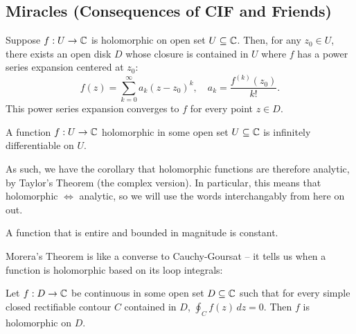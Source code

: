 \subsection{Miracles (Consequences of CIF and Friends)}
\begin{theorem}
  Suppose $f : U \to \mathbb C$ is holomorphic on open set $U \subseteq \mathbb C$. Then, for any $z_0 \in U$, there exists an open disk $D$ whose closure is contained in $U$ where $f$ has a power series expansion centered at $z_0$:
  \[ f(z) = \sum_{k = 0}^\infty a_k (z-z_0)^k, \quad a_k = \frac{f^{(k)}(z_0)}{k!}.\]
  This power series expansion converges to $f$ for every point $z \in D$.
\end{theorem}

\begin{corollary}
  A function $f : U \to \mathbb C$ holomorphic in some open set $U \subseteq \mathbb C$ is infinitely differentiable on $U$.
\end{corollary}
As such, we have the corollary that holomorphic functions are therefore analytic, by Taylor's Theorem (the complex version). In particular, this means that holomorphic $\Leftrightarrow$ analytic, so we will use the words interchangably from here on out.

\begin{theorem}
  A function that is entire and bounded in magnitude is constant.
\end{theorem}

\begin{corollary}
\end{corollary}

Morera's Theorem is like a converse to Cauchy-Goursat -- it tells us when a function is holomorphic based on its loop integrals:
\begin{theorem}
  Let $f : D \to \mathbb C$ be continuous in some open set $D \subseteq \mathbb C$ such that for every simple closed rectifiable contour $C$ contained in $D$, $\oint_C f(z) \, dz = 0$. Then $f$ is holomorphic on $D$.
\end{theorem}

